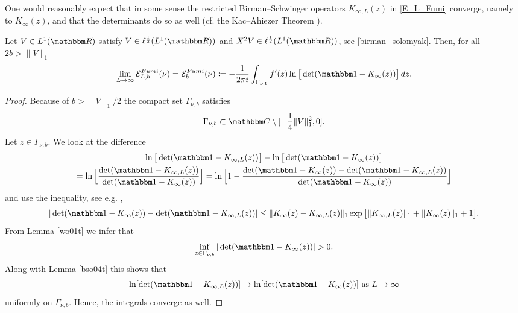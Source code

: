 One would reasonably expect that in some sense the restricted Birman--Schwinger operators $K_{\infty,L}(z)$ in \eqref{E_L_Fumi} 
converge, namely to $K_\infty(z)$, and that the determinants do so as well
(cf. the Kac--Ahiezer Theorem \cite{Kac1954,Ahiezer1964}).

\begin{lemma}\label{fumi01t}
Let $V\in L^1(\R)$ satisfy $V\in\ell^{\frac{1}{2}}(L^1(\R))$ and $X^2V\in\ell^{\frac{1}{2}}(L^1(\R))$, see \eqref{birman_solomyak}.
Then, for all $2b>\|V\|_1$
\begin{equation}\label{fumi01t01}
  \lim_{L\to\infty} \mathcal{E}^{Fumi}_{L,b}(\nu) 
    = \mathcal{E}^{Fumi}_b(\nu)  
    \coloneqq - \frac{1}{2\pi i} \int_{\Gamma_{\nu,b}} f'(z) \ln\big[\det(\id-K_\infty(z))\big]\, dz .
\end{equation}
\end{lemma}
\begin{proof}
Because of $b>\|V\|_1/2$ the compact set $\Gamma_{\nu,b}$ satisfies 
\begin{equation*}
  \Gamma_{\nu,b}\subset\C\setminus[-\frac{1}{4}\|V\|_1^2,0] .
\end{equation*}
Let $z\in\Gamma_{\nu,b}$. We look at the difference
\begin{multline*}
  \ln\big[\det(\id - K_{\infty,L}(z))\big] - \ln\big[\det(\id - K_\infty(z))\big]\\
   = \ln\Big[ \frac{\det(\id-K_{\infty,L}(z))}{\det(\id-K_\infty(z))}\Big]
   = \ln\Big[ 1 - \frac{\det(\id-K_\infty(z)) - \det(\id - K_{\infty,L}(z))}{\det(\id-K_\infty(z))}\Big]
\end{multline*}
and use the inequality, see e.g. \cite[Thm. 3.4]{Simon2005},
\begin{equation*}
  |\det(\id-K_\infty(z)) - \det(\id-K_{\infty,L}(z))| 
   \leq \|K_\infty(z) - K_{\infty,L}(z)\|_1 \exp\big[ \|K_{\infty,L}(z)\|_1+\|K_\infty(z)\|_1 + 1\big] .
\end{equation*}
From Lemma \ref{wo01t} we infer that
\begin{equation*}
  \inf_{z\in\Gamma_{\nu,b}} |\det(\id-K_\infty(z))| > 0 .
\end{equation*}
Along with Lemma \ref{bso04t} this shows that
\begin{equation*}
  \ln[\det(\id-K_{\infty,L}(z))] \to \ln[\det(\id-K_\infty(z))] \ \text{as}\ L\to\infty
\end{equation*}
uniformly on $\Gamma_{\nu,b}$. Hence, the integrals converge as well.
\end{proof}


